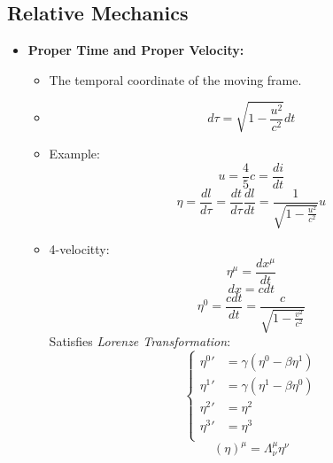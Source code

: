 \documentclass[fleqn,a4paper,12pt]{article}
\begin{document}
\subsection{Relative Mechanics}
\begin{itemize}
  \item \textbf{Proper Time and Proper Velocity:}\\
    \begin{itemize}
    \item
      The temporal coordinate of the moving frame.
    \item
      \[ d \tau = \sqrt{ 1 - \frac{u^2}{c^2} } dt \]
    \item Example:\\
      \[ u = \frac{4}{5}c = \frac{di}{dt} \]
      \[ \eta = \frac{ dl }{ d \tau } = \frac{ dt }{ d \tau } \frac{ d l }{ d t } = \frac{1}{ \sqrt{ 1 - \frac{ u^2 }{ c^2 } } } u\]

      \item 4-velocitty:
        \[ \eta ^ \mu = \frac{ d x^\mu }{ dt } \]
        \[ dx = c dt \]
        \[ \eta ^0 = \frac{ c dt }{ dt } =  \frac{ c }{ \sqrt{ 1 - \frac{ v^2 }{ c^2 } } }   \]
        Satisfies \textit{Lorenze Transformation}:\\
        \[ 
          \begin{cases}
            {\eta^0}' &= \gamma ( \eta^0 - \beta \eta^1 ) \\
            {\eta^1}' &= \gamma (\eta^1 - \beta \eta^0 )  \\
            {\eta^2}' &= \eta^2 \\
            {\eta^3}' &= \eta^3 \\
          \end{cases}
        \]
        \[(\eta)^\mu = \Lambda^\mu_\nu \eta^\nu \]


\end{itemize}
\end{itemize}
\end{document}
